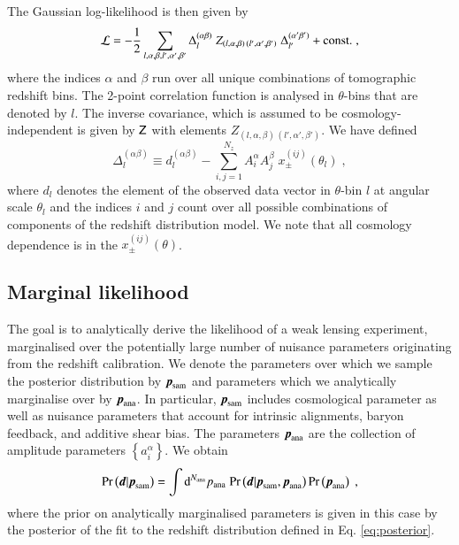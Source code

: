 \documentclass{aa}
\newcommand{\eq}[1]{\begin{equation}  #1 \end{equation}}
\newcommand{\br}[1]{\left( #1 \right)}
\newcommand{\bc}[1]{\left\{ #1 \right\}}
\newcommand{\dd}{{\rm d}}
\newcommand{\pr}{{\rm Pr}}
\begin{document}
The Gaussian log-likelihood is then given by
\eq{
{\cal L} = - \frac{1}{2} \sum_{l,\alpha,\beta, l', \alpha', \beta'} \Delta_l^{(\alpha \beta)}\; Z_{(l,\alpha,\beta) \,  (l',\alpha',\beta')}\; \Delta_{l'}^{(\alpha' \beta')} + {\rm const.}\;,
}
where the indices $\alpha$ and $\beta$ run over all unique combinations of tomographic redshift bins. The 2-point correlation function is analysed in $\theta$-bins that are denoted by $l$. The inverse covariance, which is assumed to be cosmology-independent is given by $\mathsf{Z}$ with elements $Z_{(l,\alpha,\beta) \,  (l',\alpha',\beta')}$. We have defined
\eq{
\Delta_l^{(\alpha \beta)} \equiv d_l^{(\alpha \beta)} - \sum_{i,j=1}^{N_z} A_i^\alpha A_j^\beta\; x_\pm^{(ij)}(\theta_l)\;,
}
where $d_l$ denotes the element of the observed data vector in $\theta$-bin $l$ at angular scale $\theta_l$ and the indices $i$ and $j$ count over all possible combinations of components of the redshift distribution model. We note that all cosmology dependence is in the $x_\pm^{(ij)}(\theta)$.

\subsection{Marginal likelihood}
\label{sec:marginalisation}
The goal is to analytically derive the likelihood of a weak lensing experiment, marginalised over the potentially large number of nuisance parameters originating from the redshift calibration. We denote the parameters over which we sample the posterior distribution by $\boldsymbol{p}_{\rm sam}$ and parameters which we analytically marginalise over by $\boldsymbol{p}_{\rm ana}$. In particular, $\boldsymbol{p}_{\rm sam}$ includes cosmological parameter as well as nuisance parameters that account for intrinsic alignments, baryon feedback, and additive shear bias. The parameters $\boldsymbol{p}_{\rm ana}$ are the collection of amplitude parameters $\bc{a_i^\alpha}$. We obtain
\eq{
\pr \br{\boldsymbol{d} | \boldsymbol{p}_{\rm sam}} = \int \dd^{N_{\rm ana}} p_{\rm ana}\; \pr \br{\boldsymbol{d} | \boldsymbol{p}_{\rm sam}, \boldsymbol{p}_{\rm ana}} \pr \br{\boldsymbol{p}_{\rm ana}}\;,
}
where the prior on analytically marginalised parameters is given in this case by the posterior of the fit to the redshift distribution defined in Eq. \eqref{eq:posterior}.
\end{document}
